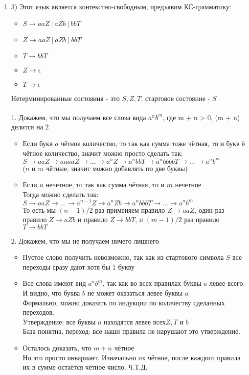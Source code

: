 \documentclass[12pt]{article}
\newenvironment{MyList}[1][4pt]{
  \begin{enumerate}[1.]
  \setlength{\parskip}{0pt}
  \setlength{\itemsep}{#1}
}{       
  \end{enumerate}
}
\begin{document}
\begin{MyList}[8pt]
 
 \item[3)] Этот язык является контекстно-свободным, предъявим КС-грамматику: \\
 \begin{itemize}
 	\item $S \to aaZ \ | \ aZb \ | \ bbT$
 	\item $Z \to aaZ \ | \ aZb \ | \ bbT$
 	\item $T \to bbT$
 	\item $Z \to \epsilon$
 	\item $T \to \epsilon$
 \end{itemize}
Нетерминированные состояния - это $S, Z, T$, стартовое состояние - $S$ \\
\\
1. Докажем, что мы получаем все слова вида $a^n b^m$, где m + n > 0, (m + n) делится на 2 \\
 \begin{itemize}
	\item Если букв $a$ чётное количество, то так как сумма тоже чётная, то и букв $b$ чётное количество, значит можно просто сделать так: \\
	$S \to aaZ \to aaaaZ \to ... \to a^nZ \to a^nbbT \to a^nbbbbT \to ... \to a^nb^m$ \\
	($n$ и $m$ чётные, значит можно добавлять по две буквы) \\
	
	\item Если $n$ нечетное, то так как сумма чётная, то и $m$ нечетное \\
	Тогда можно сделать так: \\
	$S \to aaZ \to ... \to a^{n - 1}Z \to a^nZb \to a^nbbbT \to ... \to a^nb^m$ \\
	То есть мы $(n - 1) / 2$ раз применяем правило $Z \to aaZ$, один раз правило $Z \to aZb$ и правило $Z \to bbT$, и $(m - 1) / 2$ раз правило $T \to bbT$ \\

\end{itemize}
2. Докажем, что мы не получаем ничего лишнего \\
 \begin{itemize}
 	\item Пустое слово получить невозможно, так как из стартового символа $S$ все переходы сразу дают хотя бы 1 букву \\
 	\item Все слова имеют вид $a^nb^m$, так как во всех правилах буквы $a$ левее всего. И видно, что буква $b$ не может оказаться левее буквы $a$ \\
 	Формально, можно доказать по индукции по количеству сделанных переходов. \\
 	Утверждение: все буквы $a$ находятся левее всех$Z, T$ и $b$ \\
 	База понятна, переход: все наши правила не нарушают это утверждение. \\
 	\item Осталось доказать, что $m + n$ чётное \\
 	Но это просто инвариант. Изначально их чётное, после каждого правила их в сумме остаётся чётное число. Ч.Т.Д.
 	

\end{itemize}
\end{MyList}
\end{document}
